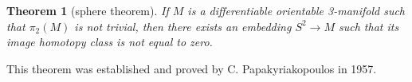 \documentclass[12pt]{article}
\newtheorem{thm}{Theorem}
\begin{document}
\begin{thm}[sphere theorem]  If $M$ is a differentiable orientable 3-manifold such that $\pi_2(M)$ is not trivial, then there exists an embedding $S^2\to M$ such that its image homotopy class is not equal to zero. \end{thm}

This theorem was established and proved by C. Papakyriakopoulos in 1957.
\end{document}
